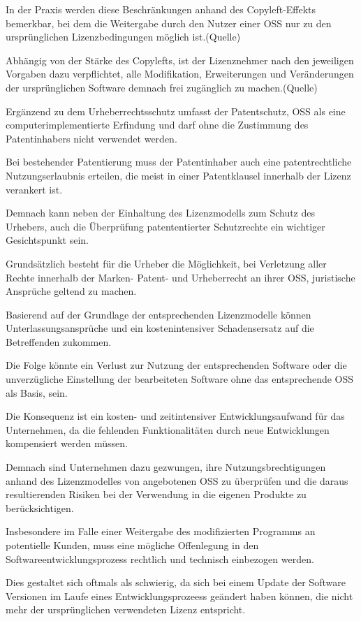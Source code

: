 In der Praxis werden diese Beschränkungen anhand des Copyleft-Effekts bemerkbar, bei dem die Weitergabe durch den Nutzer einer OSS nur zu den ursprünglichen Lizenzbedingungen möglich ist.(Quelle)  

Abhängig von der Stärke des Copylefts, ist der Lizenznehmer nach den jeweiligen Vorgaben dazu verpflichtet, alle Modifikation, Erweiterungen und Veränderungen der ursprünglichen Software demnach frei zugänglich zu machen.(Quelle) 

Ergänzend zu dem Urheberrechtsschutz umfasst der Patentschutz, OSS als eine computerimplementierte Erfindung und darf ohne die Zustimmung des Patentinhabers nicht verwendet werden.

Bei bestehender Patentierung muss der Patentinhaber auch eine patentrechtliche Nutzungserlaubnis erteilen, die meist in einer Patentklausel innerhalb der Lizenz verankert ist. 

Demnach kann neben der Einhaltung des Lizenzmodells zum Schutz des Urhebers, auch die Überprüfung patententierter Schutzrechte ein wichtiger Gesichtspunkt sein.   

Grundsätzlich besteht für die Urheber die Möglichkeit, bei Verletzung aller Rechte innerhalb der Marken- Patent- und Urheberrecht an ihrer OSS, juristische Ansprüche geltend zu machen. 

Basierend auf der Grundlage der entsprechenden Lizenzmodelle können Unterlassungsansprüche und ein kostenintensiver Schadensersatz auf die Betreffenden zukommen.

Die Folge könnte ein Verlust zur Nutzung der entsprechenden Software oder die unverzügliche Einstellung der bearbeiteten Software ohne das entsprechende OSS als Basis, sein. 

Die Konsequenz ist ein kosten- und zeitintensiver Entwicklungsaufwand für das Unternehmen, da die fehlenden Funktionalitäten durch neue Entwicklungen kompensiert werden müssen. 

Demnach sind Unternehmen dazu gezwungen, ihre Nutzungsbrechtigungen anhand des Lizenzmodelles von angebotenen OSS zu überprüfen und die daraus resultierenden Risiken bei der Verwendung in die eigenen Produkte zu berücksichtigen.  

Insbesondere im Falle einer Weitergabe des modifizierten Programms an potentielle Kunden, muss eine mögliche Offenlegung in den Softwareentwicklungsprozess rechtlich und technisch einbezogen werden.  

Dies gestaltet sich oftmals als schwierig, da sich bei einem Update der Software Versionen im Laufe eines Entwicklungsprozeess geändert haben können, die nicht mehr der ursprünglichen verwendeten Lizenz entspricht.

